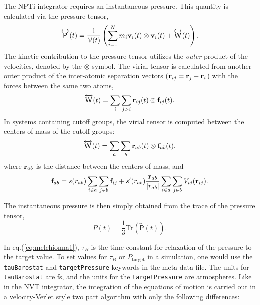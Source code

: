 \documentclass[]{book}
\begin{document}
The NPTi integrator requires an instantaneous pressure. This quantity
is calculated via the pressure tensor,
\begin{equation}
\overleftrightarrow{\mathsf{P}}(t) = \frac{1}{\mathcal{V}(t)} \left(
\sum_{i=1}^{N} m_i {\bf v}_i(t) \otimes {\bf v}_i(t) +
\overleftrightarrow{\mathsf{W}}(t) \right).
\end{equation}
The kinetic contribution to the pressure tensor utilizes the {\it
outer} product of the velocities, denoted by the $\otimes$ symbol.  The
virial tensor is calculated from another outer product of the
inter-atomic separation vectors (${\bf r}_{ij} = {\bf r}_j - {\bf
r}_i$) with the forces between the same two atoms,
\begin{equation}
\overleftrightarrow{\mathsf{W}}(t) = \sum_{i} \sum_{j>i} {\bf r}_{ij}(t)
\otimes {\bf f}_{ij}(t).
\end{equation}
In systems containing cutoff groups, the virial tensor is computed
between the centers-of-mass of the cutoff groups:
\begin{equation}
\overleftrightarrow{\mathsf{W}}(t) = \sum_{a} \sum_{b} {\bf r}_{ab}(t)
\otimes {\bf f}_{ab}(t).
\end{equation}
where ${\bf r}_{ab}$ is the distance between the centers of mass, and 
\begin{equation}
{\bf f}_{ab} = s(r_{ab}) \sum_{i \in a} \sum_{j \in b} {\bf f}_{ij} +
s^{\prime}(r_{ab}) \frac{{\bf r}_{ab}}{|r_{ab}|} \sum_{i \in a} \sum_{j
\in b} V_{ij}({\bf r}_{ij}).
\end{equation}

The instantaneous pressure is then simply obtained from the trace of
the pressure tensor,
\begin{equation}
P(t) = \frac{1}{3} \mathrm{Tr} \left( \overleftrightarrow{\mathsf{P}}(t)
\right).
\end{equation}

In eq.(\ref{eq:melchionna1}), $\tau_B$ is the time constant for
relaxation of the pressure to the target value.  To set values for
$\tau_B$ or $P_{\mathrm{target}}$ in a simulation, one would use the
{\tt tauBarostat} and {\tt targetPressure} keywords in the meta-data
file.  The units for {\tt tauBarostat} are fs, and the units for the
{\tt targetPressure} are atmospheres.  Like in the NVT integrator, the
integration of the equations of motion is carried out in a
velocity-Verlet style two part algorithm with only the following
differences:
\end{document}
